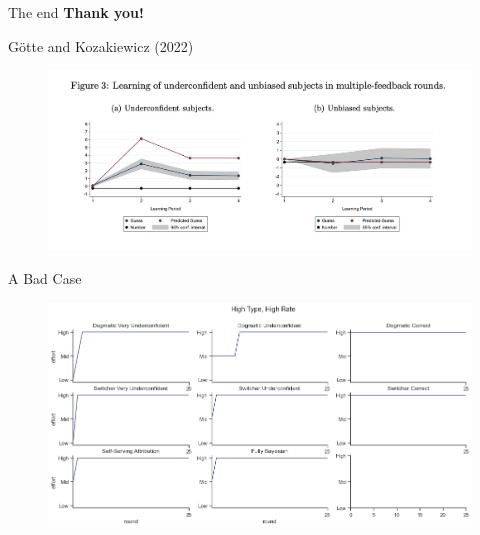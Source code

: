 \documentclass[aspectratio=169]{beamer}
\begin{document}
\begin{frame}{The end}
    \large\textbf{Thank you!}
\end{frame}

\begin{frame}{Götte and Kozakiewicz (2022) }
\label{Other Figures}
    \begin{figure}
    \centering
    \includegraphics[scale=0.45]{figures/GK_under-unbiased.png}
\end{figure}


\hyperlink{Figure1}{}       

\end{frame}

\begin{frame}{A Bad Case}
\label{WorstCase}
    \begin{figure}
    \centering
    \includegraphics[scale=0.4]{figures/all_2_2.png}
\end{figure}


\hyperlink{Figure2}{}       

\end{frame}
\end{document}

